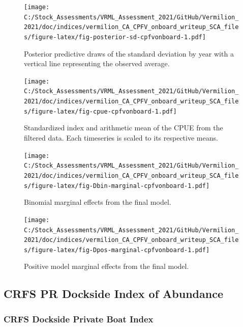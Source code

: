 \documentclass[
  english,
  a4paper,
]{article}
\begin{document}
\begin{figure}
\centering
\texttt{[image: C:/Stock\_Assessments/VRML\_Assessment\_2021/GitHub/Vermilion\_2021/doc/indices/vermilion\_CA\_CPFV\_onboard\_writeup\_SCA\_files/figure-latex/fig-posterior-sd-cpfvonboard-1.pdf]}
\caption{\label{fig:fig-posterior-sd-cpfvonboard}Posterior predictive draws of the standard deviation by year with a vertical line representing the observed average.}
\end{figure}

\begin{figure}
\centering
\texttt{[image: C:/Stock\_Assessments/VRML\_Assessment\_2021/GitHub/Vermilion\_2021/doc/indices/vermilion\_CA\_CPFV\_onboard\_writeup\_SCA\_files/figure-latex/fig-cpue-cpfvonboard-1.pdf]}
\caption{\label{fig:fig-cpue-cpfvonboard}Standardized index and arithmetic mean of the CPUE from the filtered data. Each timeseries is scaled to its respective means.}
\end{figure}

\begin{figure}
\centering
\texttt{[image: C:/Stock\_Assessments/VRML\_Assessment\_2021/GitHub/Vermilion\_2021/doc/indices/vermilion\_CA\_CPFV\_onboard\_writeup\_SCA\_files/figure-latex/fig-Dbin-marginal-cpfvonboard-1.pdf]}
\caption{\label{fig:fig-Dbin-marginal-cpfvonboard}Binomial marginal effects from the final model.}
\end{figure}

\begin{figure}
\centering
\texttt{[image: C:/Stock\_Assessments/VRML\_Assessment\_2021/GitHub/Vermilion\_2021/doc/indices/vermilion\_CA\_CPFV\_onboard\_writeup\_SCA\_files/figure-latex/fig-Dpos-marginal-cpfvonboard-1.pdf]}
\caption{\label{fig:fig-Dpos-marginal-cpfvonboard}Positive model marginal effects from the final model.}
\end{figure}

\clearpage

\hypertarget{pr-index}{%
\subsection{CRFS PR Dockside Index of Abundance}\label{pr-index}}

\hypertarget{crfs-dockside-private-boat-index}{%
\subsubsection{CRFS Dockside Private Boat Index}\label{crfs-dockside-private-boat-index}}
\end{document}
